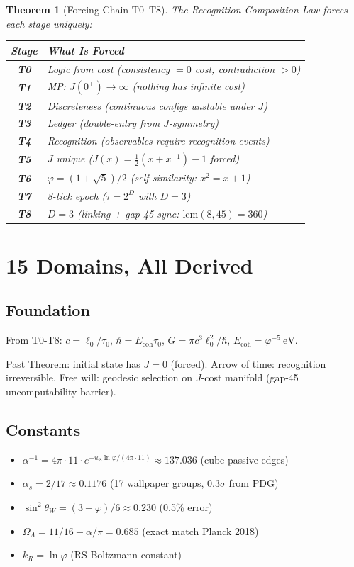 \documentclass[12pt,a4paper]{article}
\newtheorem{theorem}{Theorem}[section]
\theoremstyle{definition}
\theoremstyle{remark}
\begin{document}
\begin{theorem}[Forcing Chain T0--T8]
The Recognition Composition Law forces each stage uniquely:
\begin{center}
\begin{tabular}{>{\bfseries}cl}
\hline
Stage & What Is Forced \\
\hline
T0 & Logic from cost (consistency $= 0$ cost, contradiction $> 0$) \\
T1 & MP: $J(0^+) \to \infty$ (nothing has infinite cost) \\
T2 & Discreteness (continuous configs unstable under $J$) \\
T3 & Ledger (double-entry from $J$-symmetry) \\
T4 & Recognition (observables require recognition events) \\
T5 & $J$ unique ($J(x) = \frac{1}{2}(x+x^{-1})-1$ forced) \\
T6 & $\varphi = (1+\sqrt{5})/2$ (self-similarity: $x^2 = x+1$) \\
T7 & 8-tick epoch ($\tau = 2^D$ with $D = 3$) \\
T8 & $D = 3$ (linking + gap-45 sync: $\mathrm{lcm}(8,45) = 360$) \\
\hline
\end{tabular}
\end{center}
\end{theorem}

\section{15 Domains, All Derived}

\subsection{Foundation}

From T0-T8: $c = \ell_0/\tau_0$, $\hbar = E_\mathrm{coh}\tau_0$, 
$G = \pi c^3\ell_0^2/\hbar$, $E_\mathrm{coh} = \varphi^{-5}~\mathrm{eV}$.

Past Theorem: initial state has $J = 0$ (forced). 
Arrow of time: recognition irreversible. Free will: geodesic selection 
on $J$-cost manifold (gap-45 uncomputability barrier).

\subsection{Constants}

\begin{itemize}
\item $\alpha^{-1} = 4\pi \cdot 11 \cdot e^{-w_8\ln\varphi/(4\pi\cdot 11)} \approx 137.036$ (cube passive edges)
\item $\alpha_s = 2/17 \approx 0.1176$ (17 wallpaper groups, $0.3\sigma$ from PDG)
\item $\sin^2\theta_W = (3-\varphi)/6 \approx 0.230$ (0.5\% error)
\item $\Omega_\Lambda = 11/16 - \alpha/\pi = 0.685$ (exact match Planck 2018)
\item $k_R = \ln\varphi$ (RS Boltzmann constant)
\end{itemize}
\end{document}

